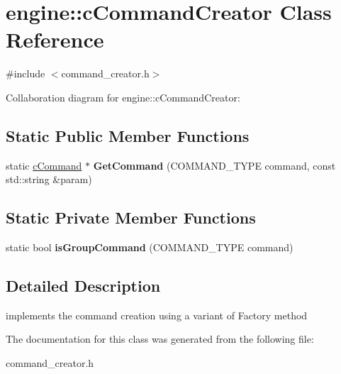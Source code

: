 \hypertarget{classengine_1_1cCommandCreator}{\section{engine\-:\-:c\-Command\-Creator Class Reference}
\label{classengine_1_1cCommandCreator}
}


{\ttfamily \#include $<$command\-\_\-creator.\-h$>$}



Collaboration diagram for engine\-:\-:c\-Command\-Creator\-:
\subsection*{Static Public Member Functions}
\begin{DoxyCompactItemize}
\item 
\hypertarget{classengine_1_1cCommandCreator_afced57cc0c6330127f73929878031911}{static \hyperlink{classengine_1_1cCommand}{c\-Command} $\ast$ {\bfseries Get\-Command} (C\-O\-M\-M\-A\-N\-D\-\_\-\-T\-Y\-P\-E command, const std\-::string \&param)}\label{classengine_1_1cCommandCreator_afced57cc0c6330127f73929878031911}

\end{DoxyCompactItemize}
\subsection*{Static Private Member Functions}
\begin{DoxyCompactItemize}
\item 
\hypertarget{classengine_1_1cCommandCreator_a219016ab2021de8c15740a1392222766}{static bool {\bfseries is\-Group\-Command} (C\-O\-M\-M\-A\-N\-D\-\_\-\-T\-Y\-P\-E command)}\label{classengine_1_1cCommandCreator_a219016ab2021de8c15740a1392222766}

\end{DoxyCompactItemize}


\subsection{Detailed Description}
implements the command creation using a variant of Factory method 

The documentation for this class was generated from the following file\-:\begin{DoxyCompactItemize}
\item 
command\-\_\-creator.\-h\end{DoxyCompactItemize}

